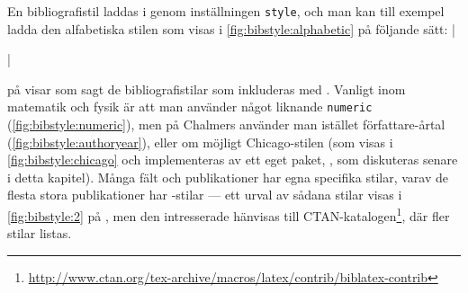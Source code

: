 \documentclass[10pt,../../a4.tex]{subfiles}
\begin{document}
En bibliografistil laddas i  genom inställningen
\texttt{style}, och man kan till exempel ladda den alfabetiska stilen
som visas i \cref{fig:bibstyle:alphabetic} på följande sätt:
\latex|\usepackage[style=alphabetic]{biblatex}|

 på  visar som sagt de bibliografistilar som inkluderas
med . Vanligt inom matematik och fysik är att man använder
något liknande \texttt{numeric} (\cref{fig:bibstyle:numeric}), men på
Chalmers använder man istället författare-årtal
(\cref{fig:bibstyle:authoryear}), eller om möjligt Chicago-stilen
(som visas i \cref{fig:bibstyle:chicago} och implementeras av ett eget
paket, , som diskuteras senare i detta kapitel).
Många fält och publikationer har egna specifika stilar, varav de flesta
stora publikationer har -stilar — ett urval av sådana
stilar visas i \cref{fig:bibstyle:2} på , men den intresserade hänvisas till
CTAN-katalogen\footnote{\url{http://www.ctan.org/tex-archive/macros/latex/contrib/biblatex-contrib}}, där fler stilar listas.
\end{document}
